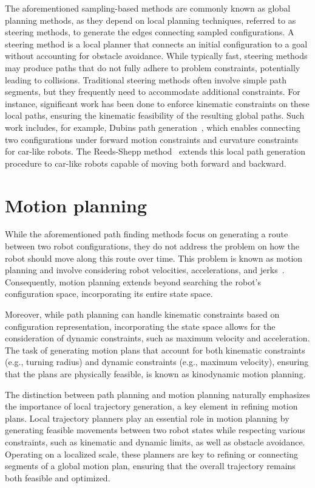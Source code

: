 The aforementioned sampling-based methods are commonly known as global planning methods, as they depend on local planning techniques, referred to as steering methods, to generate the edges connecting sampled configurations. 
A steering method is a local planner that connects an initial configuration to a goal without accounting for obstacle avoidance. 
While typically fast, steering methods may produce paths that do not fully adhere to problem constraints, potentially leading to collisions.
Traditional steering methods often involve simple path segments, but they frequently need to accommodate additional constraints.
For instance, significant work has been done to enforce kinematic constraints on these local paths, ensuring the kinematic feasibility of the resulting global paths.
Such work includes, for example, Dubins path generation~\cite{cDubins}, which enables connecting two configurations under forward motion constraints and curvature constraints for car-like robots. 
The Reeds-Shepp method~\cite{cReeds} extends this local path generation procedure to car-like robots capable of moving both forward and backward.

\section{Motion planning}\label{sec:forwardplanning}

While the aforementioned path finding methods focus on generating a route between two robot configurations, they do not address the problem on how the robot should move along this route over time.
This problem is known as motion planning and involve considering robot velocities, accelerations, and jerks~\cite{cKroger}.
Consequently, motion planning extends beyond searching the robot's configuration space, incorporating its entire state space.

Moreover, while path planning can handle kinematic constraints based on configuration representation, incorporating the state space allows for the consideration of dynamic constraints, such as maximum velocity and acceleration. 
The task of generating motion plans that account for both kinematic constraints (e.g., turning radius) and dynamic constraints (e.g., maximum velocity), ensuring that the plans are physically feasible, is known as kinodynamic motion planning.

The distinction between path planning and motion planning naturally emphasizes the importance of local trajectory generation, a key element in refining motion plans. 
Local trajectory planners play an essential role in motion planning by generating feasible movements between two robot states while respecting various constraints, such as kinematic and dynamic limits, as well as obstacle avoidance. 
Operating on a localized scale, these planners are key to refining or connecting segments of a global motion plan, ensuring that the overall trajectory remains both feasible and optimized.

